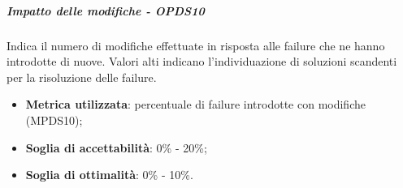 \documentclass[PdQ.tex]{subfiles}
\begin{document}
				\subparagraph{Impatto delle modifiche - OPDS10}
				Indica il numero di modifiche effettuate in risposta alle failure che ne hanno introdotte di nuove. Valori alti indicano l'individuazione di
				soluzioni scandenti per la risoluzione delle failure.
				\begin{itemize}
					\item \textbf{Metrica utilizzata}: percentuale di failure introdotte con modifiche (MPDS10);
					\item \textbf{Soglia di accettabilità}: 0\% - 20\%;
					\item \textbf{Soglia di ottimalità}: 0\% - 10\%.
				\end{itemize}
\end{document}
